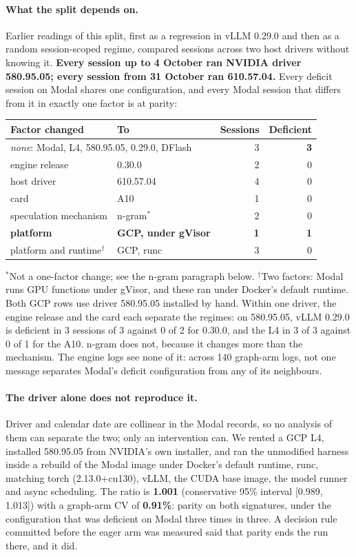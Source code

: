 \documentclass[11pt]{article}
\begin{document}
\paragraph{What the split depends on.} Earlier readings of this split, first
as a regression in vLLM 0.29.0 and then as a random session-scoped regime,
compared sessions across two host drivers without knowing it.
\textbf{Every session up to 4 October ran NVIDIA driver 580.95.05; every
session from 31 October ran 610.57.04.} Every deficit session
on Modal shares one configuration, and every Modal session that differs from
it in exactly one factor is at parity:

\begin{center}\small
\begin{tabular}{llrr}
\toprule
Factor changed & To & Sessions & Deficient\\
\midrule
\multicolumn{2}{l}{\emph{none}: Modal, L4, 580.95.05, 0.29.0, DFlash} & 3 & \textbf{3}\\
\addlinespace
engine release & 0.30.0 & 2 & 0\\
host driver & 610.57.04 & 4 & 0\\
card & A10 & 1 & 0\\
speculation mechanism & n-gram$^\ast$ & 2 & 0\\
\addlinespace
\textbf{platform} & \textbf{GCP, under gVisor} & \textbf{1} & \textbf{1}\\
platform and runtime$^\dagger$ & GCP, runc & 3 & 0\\
\bottomrule
\end{tabular}
\end{center}

\noindent
$^\ast$Not a one-factor change; see the n-gram paragraph below.
$^\dagger$Two factors: Modal runs GPU functions under gVisor, and these ran
under Docker's default runtime. Both GCP rows use driver 580.95.05 installed
by hand.
Within one driver, the engine release and the card each separate the
regimes: on 580.95.05, vLLM 0.29.0 is deficient in 3 sessions of 3 against 0
of 2 for 0.30.0, and the L4 in 3 of 3 against 0 of 1 for the A10. n-gram does
not, because it changes more than the mechanism. The engine logs see none of it: across 140
graph-arm logs, not one message separates Modal's deficit configuration from
any of its neighbours.

\paragraph{The driver alone does not reproduce it.} Driver and calendar date
are collinear in the Modal records, so no analysis of them can separate the
two; only an intervention can. We rented a GCP L4, installed 580.95.05 from
NVIDIA's own installer, and ran the unmodified harness inside a rebuild of the
Modal image under Docker's default runtime, runc, matching torch
(2.13.0+cu130), vLLM, the CUDA base image, the model runner and async
scheduling. The ratio is \textbf{1.001} (conservative
95\% interval [0.989, 1.013]) with a graph-arm CV of \textbf{0.91\%}: parity
on both signatures, under the configuration that was deficient on Modal three
times in three. A decision rule committed before the eager arm was measured
said that parity ends the run there, and it did.
\end{document}
